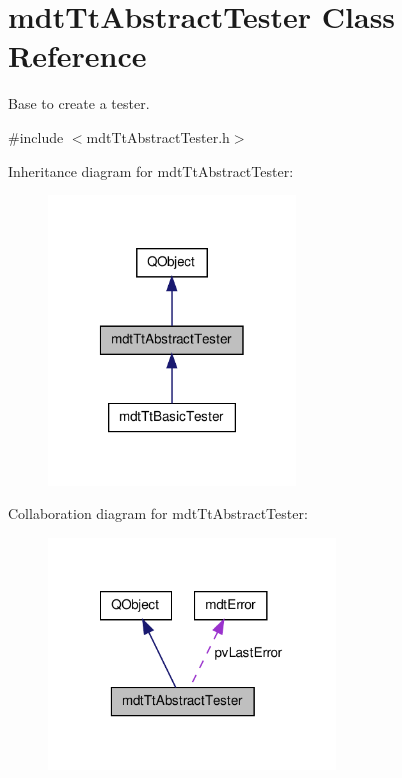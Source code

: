 \hypertarget{classmdt_tt_abstract_tester}{\section{mdt\-Tt\-Abstract\-Tester Class Reference}
\label{classmdt_tt_abstract_tester}
}


Base to create a tester.  




{\ttfamily \#include $<$mdt\-Tt\-Abstract\-Tester.\-h$>$}



Inheritance diagram for mdt\-Tt\-Abstract\-Tester\-:
\nopagebreak
\begin{figure}[H]
\begin{center}
\leavevmode
\includegraphics[width=186pt]{classmdt_tt_abstract_tester__inherit__graph}
\end{center}
\end{figure}


Collaboration diagram for mdt\-Tt\-Abstract\-Tester\-:
\nopagebreak
\begin{figure}[H]
\begin{center}
\leavevmode
\includegraphics[width=216pt]{classmdt_tt_abstract_tester__coll__graph}
\end{center}
\end{figure}

